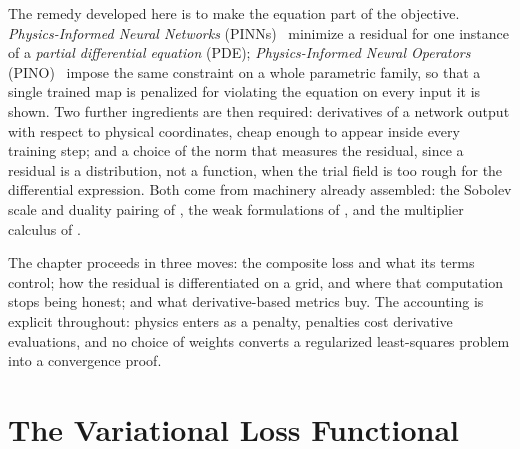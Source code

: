The remedy developed here is to make the equation part of the objective.
\emph{Physics-Informed Neural Networks}
(PINNs)~\cite{raissi2019physics} minimize a residual for one instance of a
\emph{partial differential equation} (PDE);
\emph{Physics-Informed Neural Operators}
(PINO)~\cite{li2021physics} impose the same constraint on a whole parametric family, so that
a single trained map is penalized for violating the equation on every input it is shown. Two
further ingredients are then required: derivatives of a network output with respect to
physical coordinates, cheap enough to appear inside every training step; and a choice of the
norm that measures the residual, since a residual is a distribution, not a function, when the
trial field is too rough for the differential expression. Both come from machinery already
assembled: the Sobolev scale and duality pairing of
, the weak formulations of
, and the multiplier calculus of
.

The chapter proceeds in three moves: the composite loss and what its terms control; how the
residual is differentiated on a grid, and where that computation stops being honest; and what
derivative-based metrics buy. The accounting is explicit throughout: physics enters as a
penalty, penalties cost derivative evaluations, and no choice of weights converts a
regularized least-squares problem into a convergence proof.

\section{The Variational Loss Functional}

